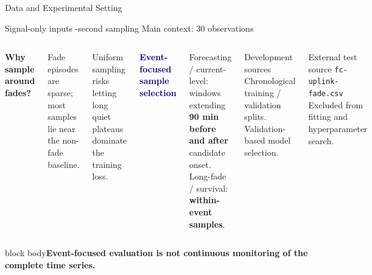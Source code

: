 \documentclass[aspectratio=169,10pt]{beamer}
\newcommand{\takeaway}[1]{\vfill\begin{beamercolorbox}[sep=2mm,wd=\textwidth]{block body}\small\textbf{#1}\end{beamercolorbox}}
\begin{document}
\begin{frame}{Data and Experimental Setting}
\noindent
{\small\color{muted}Signal-only inputs -second sampling \quad Main context: 30 observations\par}
\vspace{3mm}
\begin{columns}[T,onlytextwidth]
\textbf{Why sample around fades?}\par\vspace{2mm}
Fade episodes are sparse; most samples lie near the non-fade baseline.
\par\vspace{2mm}
\small Uniform sampling risks letting long quiet plateaus dominate the training loss.
\par\vspace{3mm}
\textcolor{navy}{\textbf{Event-focused sample selection}}\par\vspace{1mm}
Forecasting / current-level: windows extending \textbf{90 min before and after} candidate onset.\\[2mm]
Long-fade / survival: \textbf{within-event samples}.
\begin{block}{Development sources}
Chronological training / validation splits.\\[2mm]
Validation-based model selection.
\end{block}
\vspace{2mm}
\begin{block}{External test source}
\texttt{fc-uplink-fade.csv}\\[2mm]
Excluded from fitting and hyperparameter search.
\end{block}
\end{columns}
\takeaway{Event-focused evaluation is not continuous monitoring of the complete time series.}
\end{frame}

\end{document}
